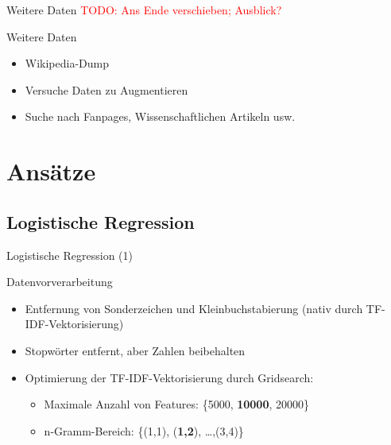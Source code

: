 \documentclass[aspectratio=169]{beamer} %
\begin{document}
\begin{frame}{Weitere Daten}
    \textcolor{red}{TODO: Ans Ende verschieben; Ausblick?}
    \begin{block}{Weitere Daten}
        \begin{itemize}
            \item Wikipedia-Dump
            \item Versuche Daten zu Augmentieren
            \item Suche nach Fanpages, Wissenschaftlichen Artikeln usw.
        \end{itemize}
    \end{block}
\end{frame}


\section{Ans\"atze}

\subsection{Logistische Regression}

\begin{frame}{Logistische Regression (1)}
    \begin{block}{Datenvorverarbeitung}
        \begin{itemize}
            \item Entfernung von Sonderzeichen und Kleinbuchstabierung (nativ durch TF-IDF-Vektorisierung)
            \item Stopw\"orter entfernt, aber Zahlen beibehalten
            \item Optimierung der TF-IDF-Vektorisierung durch Gridsearch:
                  \begin{itemize}
                      \item Maximale Anzahl von Features: \{5000, \textbf{10000}, 20000\}
                      \item n-Gramm-Bereich: \{(1,1), (\textbf{1,2}), \dots ,(3,4)\}
                  \end{itemize}
        \end{itemize}
    \end{block}
\end{frame}
\end{document}
